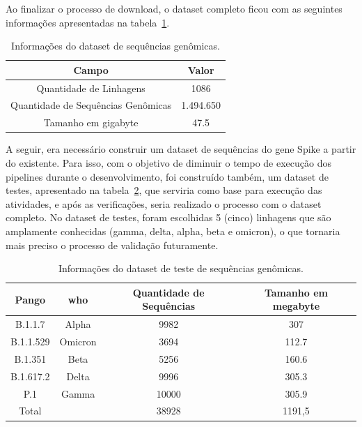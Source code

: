 Ao finalizar o processo de download, o dataset completo ficou com as seguintes informações apresentadas na tabela~\ref{tab:datasetGenomas}.

\begin{table}[htb]
  \caption{Informações do dataset de sequências genômicas.}
  \begin{center}
    \begin{tabular}{|c|c|}
      \hline
      Campo                              & Valor     \\
      \hline
      Quantidade de Linhagens            & 1086      \\
      Quantidade de Sequências Genômicas & 1.494.650 \\
      Tamanho em \gls{gigabyte}          & 47.5      \\
      \hline
    \end{tabular}
  \end{center}
  \label{tab:datasetGenomas}
\end{table}

A seguir, era necessário construir um dataset de sequências do gene Spike a partir do existente. Para isso, com o objetivo de diminuir o tempo de execução dos pipelines durante o desenvolvimento, foi construído também, um dataset de testes, apresentado na tabela~\ref{tab:datasetGenomasTeste}, que serviria como base para execução das atividades, e após as verificações, seria realizado o processo com o dataset completo. No dataset de testes, foram escolhidas 5 (cinco) linhagens que são amplamente conhecidas (gamma, delta, alpha, beta e omicron), o que tornaria mais preciso o processo de validação futuramente.

\begin{table}[htb]
  \caption{Informações do dataset de teste de sequências genômicas.}
  \begin{center}
    \begin{tabular}{|c|c|c|c|}
      \hline
      Pango     & \gls{who} & Quantidade de Sequências & Tamanho em \gls{megabyte} \\
      \hline
      B.1.1.7   & Alpha     & 9982                     & 307                       \\
      B.1.1.529 & Omicron   & 3694                     & 112.7                     \\
      B.1.351   & Beta      & 5256                     & 160.6                     \\
      B.1.617.2 & Delta     & 9996                     & 305.3                     \\
      P.1       & Gamma     & 10000                    & 305.9                     \\
      \hline
      Total     &           & 38928                    & 1191,5                    \\
      \hline
    \end{tabular}
  \end{center}
  \label{tab:datasetGenomasTeste}
\end{table}

